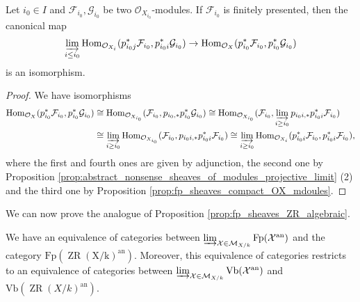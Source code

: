 \documentclass [11pt,reqno]{amsart}
\newcommand{\1}{\mathmybb{1}}
\def\cF{{\mathcal{F}}}
\def\cG{{\mathcal{G}}}
\def\cM{{\mathcal{M}}}
\def\cO{{\mathcal{O}}}
\def\cX{{\mathcal{X}}}
\def\an{\operatorname{an}}
\def\Hom{\operatorname{Hom}}
\def\ZR{\operatorname{ZR}}
\begin{document}
\begin{proposition}
\label{prop:equivalence_categories_fp_sheaves}
Let $i_{0}\in I$ and $\cF_{i_{0}},\cG_{i_{0}}$ be two $\cO_{X_{i_{0}}}$-modules. If $\cF_{i_{0}}$ is finitely presented, then the canonical map
\begin{align*}
\displaystyle\varinjlim_{i\leq i_{0}}\Hom_{\cO_{X_{i}}}(p_{i_{0}j}^{\ast}\cF_{i_{0}},p_{i_{0}i}^{\ast}\cG_{i_{0}}) \to \Hom_{\cO_{X}}(p_{i_{0}}^{\ast}\cF_{i_{0}},p_{i_{0}}^{\ast}\cG_{i_{0}})
\end{align*}
is an isomorphism.
\end{proposition}

\begin{proof}
We have isomorphisms 
\begin{align*}
\Hom_{\cO_{X}}(p_{i_{0}}^{\ast}\cF_{i_{0}},p_{i_{0}}^{\ast}\cG_{i_{0}}) &\cong \Hom_{\cO_{X_{i_{0}}}}(\cF_{i_{0}},p_{i_{0},\ast}p_{i_{0}}^{\ast}\cG_{i_{0}}) \cong \Hom_{\cO_{X_{i_{0}}}}(\cF_{i_{0}},\displaystyle\varinjlim_{i\geq i_{0}}p_{i_{0}i,\ast}p_{i_{0}i}^{\ast}\cF_{i_{0}})\\
& \cong \varinjlim_{i\geq i_{0}}\Hom_{\cO_{X_{i_{0}}}}(\cF_{i_{0}},p_{i_{0}i,\ast}p_{i_{0}i}^{\ast}\cF_{i_{0}})\cong \varinjlim_{i\geq i_{0}}\Hom_{\cO_{X_{i}}}(p_{i_{0}i}^{\ast}\cF_{i_{0}},p_{i_{0}i}^{\ast}\cF_{i_{0}}),
\end{align*}
where the first and fourth ones are given by adjunction, the second one by Proposition \ref{prop:abstract_nonsense_sheaves_of_modules_projective_limit} (2) and the third one by Proposition \ref{prop:fp_sheaves_compact_OX_mdoules}.
\end{proof}

We can now prove the analogue of Proposition \ref{prop:fp_sheaves_ZR_algebraic}.

\begin{proposition}
\label{prop:fp_sheaves_ZR_analytic}
We have an equivalence of categories between $\varinjlim_{\cX\in\cM_{X/k}} \mathrm{Fp}(\cX^{\an})$ and the category $\mathrm{Fp(\ZR(X/k)^{\an})}$. Moreover, this equivalence of categories restricts to an equivalence of categories between $\varinjlim_{\cX\in\cM_{X/k}}\mathrm{Vb}(\cX^{\an})$ and $\mathrm{Vb}(\ZR(X/k)^{\an})$.
\end{proposition}
\end{document}
